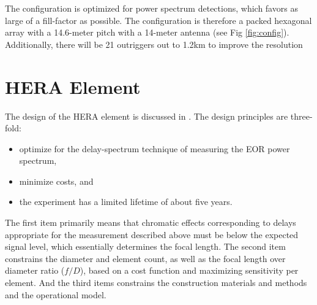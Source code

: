 \documentclass{ICEAA-IEEE_APWC}
\begin{document}
The configuration is optimized for power spectrum detections, which favors as large of a fill-factor as possible.  The configuration is therefore a packed hexagonal array with a 14.6-meter pitch with a 14-meter antenna (see Fig \ref{fig:config}).  Additionally, there will be 21 outriggers out to 1.2km to improve the resolution 


\section{HERA Element}
\label{sec:element}
The design of the HERA element is discussed in \cite{heraMemo5}.  The design principles are three-fold:
\begin{itemize}
\item optimize for the delay-spectrum technique of measuring the EOR power spectrum,
\item minimize costs, and
\item the experiment has a limited lifetime of about five years.
\end{itemize}
The first item primarily means that chromatic effects corresponding to delays appropriate for the measurement described above must be below the expected signal level, which essentially determines the focal length.  The second item constrains the diameter and element count, as well as the focal length over diameter ratio ($f/D$), based on a cost function and maximizing sensitivity per element.  And the third items constrains the construction materials and methods and the operational model.
\end{document}
